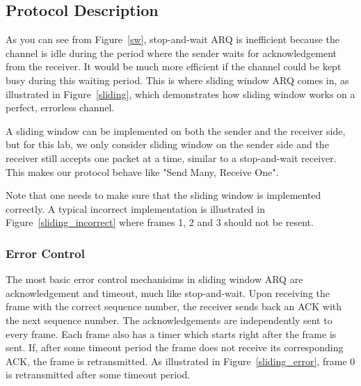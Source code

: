 \documentclass[11pt]{article}
\begin{document}
\subsection{Protocol Description}
\label{sec:protocol}
As you can see from Figure~\ref{sw}, stop-and-wait ARQ is inefficient because the channel is idle during the period where the sender waits for acknowledgement from the receiver.
It would be much more efficient if the channel could be kept busy during this waiting period.
This is where sliding window ARQ comes in, as illustrated in Figure~\ref{sliding}, which demonstrates how sliding window works on a perfect, errorless channel.

A sliding window can be implemented on both the sender and the receiver side, but for this lab, we only consider sliding window on the sender side and the receiver still accepts one packet
at a time, similar to a stop-and-wait receiver. This makes our protocol behave like "Send Many, Receive One".

Note that one needs to make sure that the sliding window is implemented correctly.
A typical incorrect implementation is illustrated in Figure~\ref{sliding_incorrect} where frames 1, 2 and 3 should not be resent.


\subsubsection{Error Control}
The most basic error control mechanisims in sliding window ARQ are acknowledgement and timeout, much like stop-and-wait.
Upon receiving the frame with the correct sequence number, the receiver sends back an ACK with the next sequence number.
The acknowledgements are independently sent to every frame.
Each frame also has a timer which starts right after the frame is sent.
If, after some timeout period the frame does not receive its corresponding ACK, the frame is retransmitted.
As illustrated in Figure~\ref{sliding_error}, frame 0 is retransmitted after some timeout period.
\end{document}
